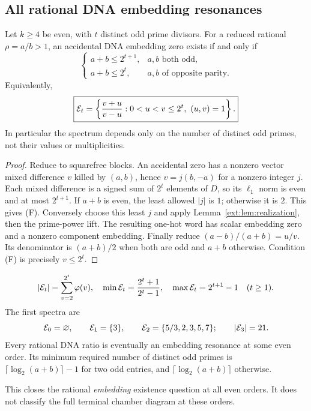 \subsection{All rational DNA embedding resonances}\label{ext:sec:farey}
\begin{theorem}\label{ext:thm:farey}
Let $k\ge4$ be even, with $t$ distinct odd prime divisors. For a reduced rational $\rho=a/b>1$, an accidental DNA embedding zero exists if and only if
\[
\begin{cases}
a+b\le2^{t+1},&a,b\text{ both odd},\\
a+b\le2^t,&a,b\text{ of opposite parity}.
\end{cases}                                                    \tag{F}
\]
Equivalently,
\[
\boxed{\E_t=\left\{\frac{v+u}{v-u}:0<u<v\le2^t,\ (u,v)=1\right\}.}
\]
In particular the spectrum depends only on the number of distinct odd primes, not their values or multiplicities.
\end{theorem}
\begin{proof}
Reduce to squarefree blocks. An accidental zero has a nonzero vector mixed difference $v$ killed by $(a,b)$, hence $v=j(b,-a)$ for a nonzero integer $j$. Each mixed difference is a signed sum of $2^t$ elements of $D$, so its $\ell_1$ norm is even and at most $2^{t+1}$. If $a+b$ is even, the least allowed $|j|$ is $1$; otherwise it is $2$. This gives (F). Conversely choose this least $j$ and apply Lemma~\ref{ext:lem:realization}, then the prime-power lift. The resulting one-hot word has scalar embedding zero and a nonzero component embedding. Finally reduce $(a-b)/(a+b)=u/v$. Its denominator is $(a+b)/2$ when both are odd and $a+b$ otherwise. Condition (F) is precisely $v\le2^t$.
\end{proof}
\begin{corollary}
\[
|\mathcal E_t|=\sum_{v=2}^{2^t}\varphi(v),\quad
\min\mathcal E_t=\frac{2^t+1}{2^t-1},\quad
\max\mathcal E_t=2^{t+1}-1\quad(t\ge1).
\]
The first spectra are
\[
\mathcal E_0=\varnothing,\qquad\mathcal E_1=\{3\},\qquad
\mathcal E_2=\{5/3,2,3,5,7\};\qquad |\mathcal E_3|=21.
\]
Every rational DNA ratio is eventually an embedding resonance at some even order. Its minimum required number of distinct odd primes is $\lceil\log_2(a+b)\rceil-1$ for two odd entries, and $\lceil\log_2(a+b)\rceil$ otherwise.
\end{corollary}
This closes the rational \emph{embedding} existence question at all even orders. It does not classify the full terminal chamber diagram at these orders.


